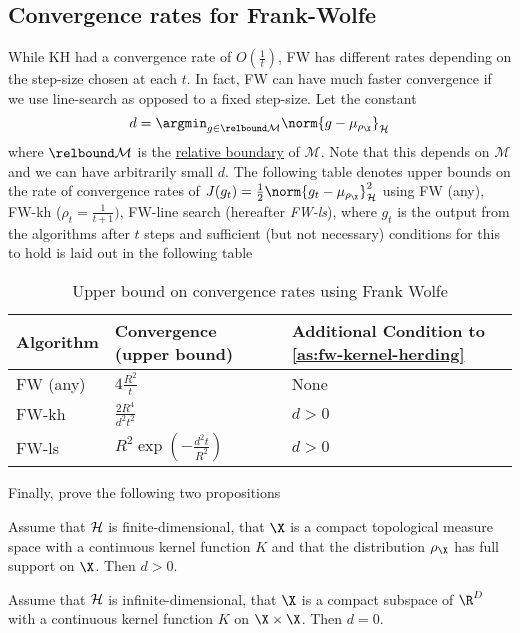 \subsection{Convergence rates for Frank-Wolfe}
\label{sec:org9640d5f} While KH had a convergence rate of \(O(\frac{1}{t})\), FW
has different rates depending on the step-size chosen at each \(t\). In fact, FW
can have much faster convergence if we use line-search as opposed to a fixed
step-size. Let the constant
\begin{equation}
\label{eq:d-radius-of-biggest-interior-ball} d = \argmin_{g \in \relbound
\mathcal{M}} \norm{g - \mu_{\rho_{\X}}}_{\rkhs{H}}
\end{equation} where \(\relbound \mathcal{M}\) is the
\hyperref[def:relative-boundary]{relative boundary} of \(\mathcal{M}\). Note
that this depends on \(\mathcal{M}\) and we can have arbitrarily small \(d\).
The following table denotes upper bounds on the rate of convergence rates of
\(J(g_{t}) = \frac{1}{2} \norm{g_{t} - \mu_{\rho_{\X}}}^{2}_{\rkhs{H}}\)
using FW (any), FW-kh (\(\rho_{t} =
\frac{1}{t+1})\), FW-line search (hereafter \emph{FW-ls}), where \(g_{t}\) is
the output from the algorithms after \(t\) steps and sufficient (but not
necessary) conditions for this to hold is laid out in the following table

\begin{table}[htbp]
\caption{\label{tbl:FW-convergence-table} Upper bound on convergence rates using
Frank Wolfe} \centering
\begin{tabular}{lll} \hline Algorithm & Convergence (upper bound) & Additional
Condition to \ref{as:fw-kernel-herding}\\ \hline FW (any) & \(4\frac{R^{2}}{t}\)
& None\\ FW-kh & \(\frac{2R^{4}}{d^{2}t^{2}}\) & \(d > 0\)\\ FW-ls & \(R^{2}
\exp(-\frac{d^{2}t}{R^{2}})\) & \(d > 0\)\\ \hline
\end{tabular}
\end{table}

Finally, \cite{bach12_equiv_between_herdin_condit_gradien_algor} prove the following two propositions
\begin{proposition}
\label{prop:finite-dim-fw-has-speedup} Assume that \(\mathcal{H}\) is
finite-dimensional, that \(\X\) is a compact topological measure space with a
continuous kernel function \(K\) and that the distribution \(\rho_{\X}\) has
full support on \(\X\). Then \(d > 0\).
\end{proposition}

\begin{proposition}
\label{prop:infinite-dim-fw-has-probably-not-speedup} Assume that \(\mathcal{H}\)
is infinite-dimensional, that \(\X\) is a compact subspace of \(\R^D\) with a
continuous kernel function \(K\) on \(\X \times \X\). Then \(d = 0\).
\end{proposition}

